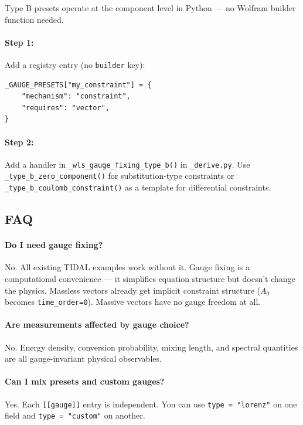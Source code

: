 Type B presets operate at the component level in Python --- no Wolfram builder
function needed.

\paragraph{Step 1:} Add a registry entry (no \texttt{builder} key):

\begin{lstlisting}[style=python]
_GAUGE_PRESETS["my_constraint"] = {
    "mechanism": "constraint",
    "requires": "vector",
}
\end{lstlisting}

\paragraph{Step 2:} Add a handler in \texttt{\_wls\_gauge\_fixing\_type\_b()} in \texttt{\_derive.py}.
Use \texttt{\_type\_b\_zero\_component()} for substitution-type constraints or
\texttt{\_type\_b\_coulomb\_constraint()} as a template for differential constraints.

\subsection{FAQ}
\label{sec:gauge-faq}

\paragraph{Do I need gauge fixing?}
No. All existing TIDAL examples work without it. Gauge fixing is a
computational convenience --- it simplifies equation structure but doesn't
change the physics. Massless vectors already get implicit constraint
structure ($A_0$ becomes \texttt{time\_order=0}). Massive vectors have no gauge
freedom at all.

\paragraph{Are measurements affected by gauge choice?}
No. Energy density, conversion probability, mixing length, and spectral
quantities are all gauge-invariant physical observables.

\paragraph{Can I mix presets and custom gauges?}
Yes. Each \texttt{[[gauge]]} entry is independent. You can use \texttt{type = "lorenz"}
on one field and \texttt{type = "custom"} on another.

